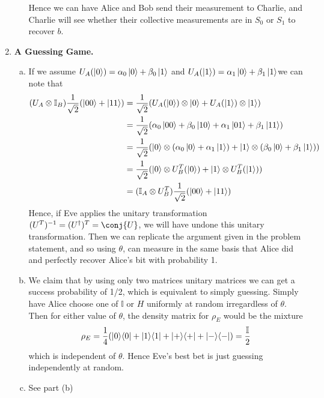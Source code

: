 \documentclass[12pt]{article}
\begin{document}
\begin{enumerate}
\begin{enumerate}[(a)]
 Hence we can have Alice and Bob send their measurement to Charlie, and Charlie will see whether their collective measurements are in $S_0$ or $S_1$ to recover $b$.
\end{enumerate} 





\item \textbf{A Guessing Game.}
\begin{enumerate}[(a)]
\item If we assume $U_A(\ket{0}) = \alpha_0\ket{0}+\beta_0\ket{1}$ and $U_A(\ket{1}) = \alpha_1\ket{0}+\beta_1\ket{1}$we can note that $$\begin{aligned}(U_A\otimes \mathbb{I}_B)\frac{1}{\sqrt{2}}(\ket{00}+\ket{11}) & = \frac{1}{\sqrt{2}}(U_A(\ket{0})\otimes \ket{0} + U_A(\ket{1})\otimes \ket{1}) \\ & = \frac{1}{\sqrt{2}}(\alpha_0\ket{00}+\beta_0\ket{10} + \alpha_1\ket{01}+\beta_1\ket{11}) \\ & = \frac{1}{\sqrt{2}} (\ket{0}\otimes (\alpha_0\ket{0}+\alpha_1\ket{1}) + \ket{1}\otimes (\beta_0\ket{0} + \beta_1\ket{1})) \\ & = \frac{1}{\sqrt{2}}(\ket{0}\otimes U_B^T(\ket{0}) + \ket{1}\otimes U_B^T(\ket{1})) \\ & = (\mathbb{I}_A\otimes U_B^T)\frac{1}{\sqrt{2}}(\ket{00}+\ket{11})\end{aligned}$$ Hence, if Eve applies the unitary transformation $(U^T)^{-1} = (U^\dagger)^T = \conj{U}$, we will have undone this unitary transformation. Then we can replicate the argument given in the problem statement, and so using $\theta$, can measure in the same basis that Alice did and perfectly recover Alice's bit with probability 1. \\

\item We claim that by using only two matrices unitary matrices we can get a success probability of 1/2, which is equivalent to simply guessing. Simply have Alice choose one of $\mathbb{I}$ or $H$ uniformly at random irregardless of $\theta$. Then for either value of $\theta$, the density matrix for $\rho_E$ would be the mixture $$ \rho_E = \frac{1}4 (\ket{0}\!\bra{0} + \ket{1}\!\bra{1} + \ket{+}\!\bra{+} +\ket{-}\!\bra{-}) = \frac{\mathbb{I}}2$$ which is independent of $\theta$. Hence Eve's best bet is just guessing independently at random.

\item See part (b)
\end{enumerate}


\end{enumerate}
\end{document}
